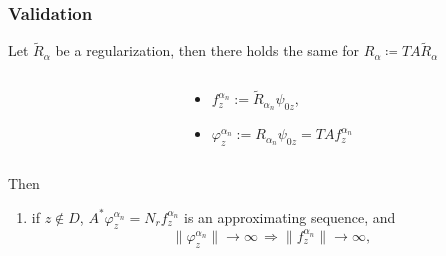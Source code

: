 \documentclass[10pt]{beamer}
\theoremstyle{plain}
\theoremstyle{plain}
\let\phi\varphi
\begin{document}
\begin{frame}
 \frametitle{Validation}
Let $\tilde{R}_\alpha$ be a regularization, then there holds the same for $R_\alpha\coloneqq TA\tilde{R}_\alpha$
\begin{columns}[T]
 \begin{column}{0.5\textwidth}
 \end{column}
 \begin{column}{0.5\textwidth}
 \begin{itemize}
  \item $f_z^{\alpha_n}:=\tilde{R}_{\alpha_n}\psi_{0z}$,
  \item $\phi_z^{\alpha_n}:=R_{\alpha_n}\psi_{0z} = TA f_z^{\alpha_n}$
 \end{itemize}
  \end{column}
\end{columns}

\begin{corollary}
Then
\begin{enumerate}
 \item if $z\notin D$, $A^*\phi_z^{\alpha_n} = {N_r}f_z^{\alpha_n}$ is an 
 approximating sequence, and
\begin{equation*}
 \|\phi_z^{\alpha_n}\|\to\infty\,\Rightarrow\|f_z^{\alpha_n}\|\to\infty,
\end{equation*}


\end{enumerate}
\end{corollary}
\end{frame}
\end{document}
